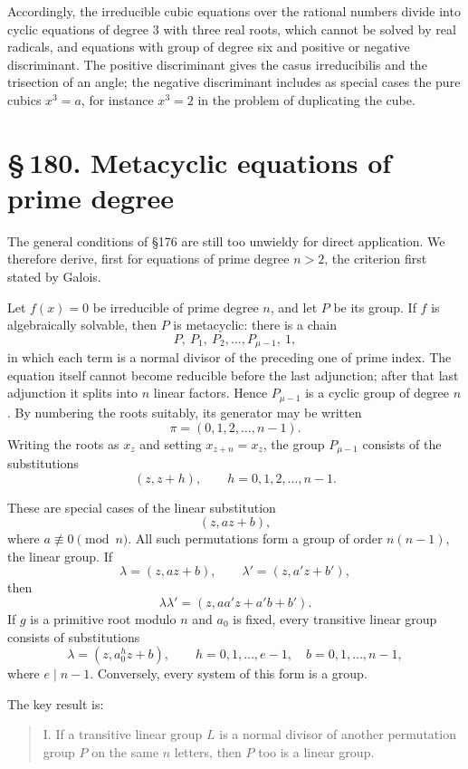 \documentclass[11pt]{article}
\newcommand{\sect}[2]{\section*{\S\,#1. #2}}
\begin{document}
Accordingly, the irreducible cubic equations over the rational numbers divide into cyclic equations of degree $3$ with three real roots, which cannot be solved by real radicals, and equations with group of degree six and positive or negative discriminant. The positive discriminant gives the casus irreducibilis and the trisection of an angle; the negative discriminant includes as special cases the pure cubics $x^3=a$, for instance $x^3=2$ in the problem of duplicating the cube.

\sect{180}{Metacyclic equations of prime degree}

The general conditions of §176 are still too unwieldy for direct application. We therefore derive, first for equations of prime degree $n>2$, the criterion first stated by Galois.

Let $f(x)=0$ be irreducible of prime degree $n$, and let $P$ be its group. If $f$ is algebraically solvable, then $P$ is metacyclic: there is a chain
\[
  P,\ P_1,\ P_2,\ldots, P_{\mu-1},\ 1,                         \tag{1}
\]
in which each term is a normal divisor of the preceding one of prime index. The equation itself cannot become reducible before the last adjunction; after that last adjunction it splits into $n$ linear factors. Hence $P_{\mu-1}$ is a cyclic group of degree $n$. By numbering the roots suitably, its generator may be written
\[
  \pi=(0,1,2,\ldots,n-1).
\]
Writing the roots as $x_z$ and setting $x_{z+n}=x_z$, the group $P_{\mu-1}$ consists of the substitutions
\[
  (z,z+h),\qquad h=0,1,2,\ldots,n-1.                            \tag{2}
\]

These are special cases of the linear substitution
\[
  (z,az+b),                                                     \tag{3}
\]
where $a\not\equiv0\pmod n$. All such permutations form a group of order $n(n-1)$, the linear group. If
\[
  \lambda=(z,az+b),\qquad \lambda'=(z,a'z+b'),
\]
then
\[
  \lambda\lambda'=(z,aa'z+a'b+b').                              \tag{4}
\]
If $g$ is a primitive root modulo $n$ and $a_0$ is fixed, every transitive linear group consists of substitutions
\[
  \lambda=(z,a_0^h z+b),\qquad h=0,1,\ldots,e-1,
  \quad b=0,1,\ldots,n-1,                                      \tag{5}
\]
where $e\mid n-1$. Conversely, every system of this form is a group.

The key result is:
\begin{quote}
I. If a transitive linear group $L$ is a normal divisor of another permutation group $P$ on the same $n$ letters, then $P$ too is a linear group.
\end{quote}
\end{document}
